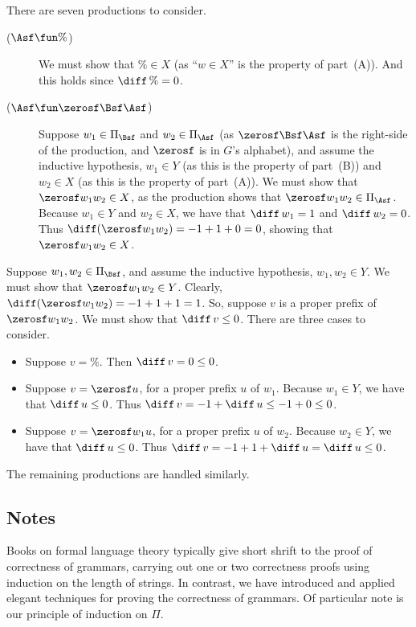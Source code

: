 There are seven productions to consider.
\begin{description}
\item[\quad($\Asf\fun\%$)] We must show that $\%\in X$ (as
  ``$w\in X$'' is the property of part~(A)).  And this holds since
  $\diff\,\% = 0$.

\item[\quad($\Asf\fun\zerosf\Bsf\Asf$)] Suppose $w_1\in\Pi_\Bsf$ and
  $w_2\in\Pi_\Asf$ (as $\zerosf\Bsf\Asf$ is the right-side of the
  production, and $\zerosf$ is in $G$'s alphabet),
  and assume the inductive hypothesis,
  $w_1\in Y$ (as this is the property of part~(B)) and
  $w_2\in X$ (as this is the property of part~(A)).  We
  must show that $\zerosf w_1w_2\in X$, as the production
  shows that $\zerosf w_1w_2\in\Pi_\Asf$.  Because
  $w_1\in Y$ and $w_2\in X$, we have that $\diff\,w_1=1$ and
  $\diff\,w_2=0$.  Thus $\diff(\zerosf w_1w_2) = -1 + 1 + 0 = 0$, showing
  that $\zerosf w_1w_2\in X$.
\end{description}

\begin{description}
\item[\quad($\Bsf\fun\zerosf\Bsf\Bsf$)] Suppose $w_1,w_2\in\Pi_\Bsf$,
  and assume the inductive hypothesis, $w_1,w_2\in Y$.  We must show
  that $\zerosf w_1w_2\in Y$.  Clearly, $\diff(\zerosf w_1w_2) =
  -1 + 1 + 1 = 1$.  So, suppose $v$ is a proper prefix of
  $\zerosf w_1w_2$.  We must show that $\diff\,v\leq 0$.
  There are three cases to consider.
  \begin{itemize}
  \item Suppose $v = \%$.  Then $\diff\,v = 0\leq 0$.

  \item Suppose $v=\zerosf u$, for a proper prefix $u$ of $w_1$.
    Because $w_1\in Y$, we have that $\diff\,u\leq 0$.  Thus
    $\diff\,v = -1 + \diff\,u \leq -1 + 0\leq 0$.

  \item Suppose $v=\zerosf w_1u$, for a proper prefix $u$ of $w_2$.
    Because $w_2\in Y$, we have that $\diff\,u\leq 0$.
    Thus $\diff\,v = -1 + 1 + \diff\,u = \diff\,u\leq 0$.
  \end{itemize}

\item The remaining productions are handled similarly.
\end{description}

\subsection{Notes}

Books on formal language theory typically give short shrift to the
proof of correctness of grammars, carrying out one or two
correctness proofs using induction on the length of strings.  In
contrast, we have introduced and applied elegant techniques for
proving the correctness of grammars.  Of particular note is our principle
of induction on $\Pi$.

